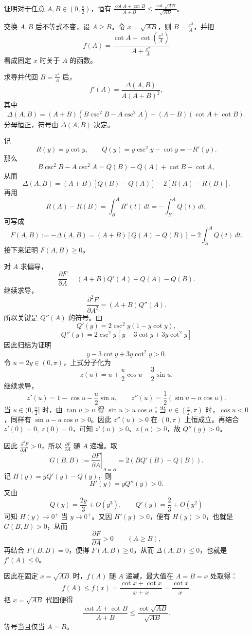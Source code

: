 \begin{example}
    证明对于任意 $A, B \in (0, \frac{\pi}{2})$，恒有 $\displaystyle\frac{\cot A + \cot B}{A+B} \le \frac{\cot \sqrt{AB}}{\sqrt{AB}}$。
\end{example}
\begin{solution}
交换 \(A,B\) 后不等式不变，设 \(A\ge B\)。令 \(x=\sqrt{AB}\)，则 \(B=\frac{x^2}{A}\)，并把
\[
f(A)=\frac{\cot A+\cot\!\left(\frac{x^2}{A}\right)}{A+\frac{x^2}{A}}
\]
看成固定 \(x\) 时关于 \(A\) 的函数。

求导并代回 \(B=\frac{x^2}{A}\) 后，
\[
f'(A)=\frac{\Delta(A,B)}{A(A+B)^2},
\]
其中
\[
\Delta(A,B)=(A+B)(B\csc^2B-A\csc^2A)-(A-B)(\cot A+\cot B).
\]
分母恒正，符号由 \(\Delta(A,B)\) 决定。

记
\[
R(y)=y\cot y,\qquad Q(y)=y\csc^2y-\cot y=-R'(y).
\]
那么
\[
B\csc^2B-A\csc^2A=Q(B)-Q(A)+\cot B-\cot A,
\]
从而
\[
\Delta(A,B)=(A+B)[Q(B)-Q(A)]-2[R(A)-R(B)].
\]
再用
\[
R(A)-R(B)=\int_B^A R'(t)\,dt=-\int_B^A Q(t)\,dt,
\]
可写成
\[
F(A,B):=-\Delta(A,B)=(A+B)[Q(A)-Q(B)]-2\int_B^A Q(t)\,dt.
\]
接下来证明 \(F(A,B)\ge0\)。

对 \(A\) 求偏导，
\[
\frac{\partial F}{\partial A}=(A+B)Q'(A)-Q(A)-Q(B).
\]
继续求导，
\[
\frac{\partial^2 F}{\partial A^2}=(A+B)Q''(A).
\]
所以关键是 \(Q''(A)\) 的符号。由
\[
Q'(y)=2\csc^2y(1-y\cot y),
\]
\[
Q''(y)=2\csc^2y\,[y-3\cot y+3y\cot^2y]
\]
因此归结为证明
\[
y-3\cot y+3y\cot^2y>0.
\]
令 \(u=2y\in(0,\pi)\)，上式分子化为
\[
z(u)=u+\frac{u}{2}\cos u-\frac32\sin u.
\]
继续求导，
\[
z'(u)=1-\cos u-\frac{u}{2}\sin u,\qquad
z''(u)=\frac12(\sin u-u\cos u).
\]
当 \(u\in(0,\frac{\pi}{2}]\) 时，由 \(\tan u>u\) 得 \(\sin u>u\cos u\)；当 \(u\in(\frac{\pi}{2},\pi)\) 时，\(\cos u<0\)，同样有 \(\sin u-u\cos u>0\)。因此 \(z''(u)>0\) 在 \((0,\pi)\) 上恒成立。再结合 \(z'(0)=0,\ z(0)=0\)，可知 \(z'(u)>0\)、\(z(u)>0\)，故 \(Q''(y)>0\)。

因此 \(\frac{\partial^2 F}{\partial A^2}>0\)，所以 \(\frac{\partial F}{\partial A}\) 随 \(A\) 递增。取
\[
G(B,B):=\left.\frac{\partial F}{\partial A}\right|_{A=B}=2(BQ'(B)-Q(B)).
\]
记 \(H(y)=yQ'(y)-Q(y)\)，则
\[
H'(y)=yQ''(y)>0.
\]
又由
\[
Q(y)=\frac{2y}{3}+O(y^3),\qquad Q'(y)=\frac{2}{3}+O(y^2)
\]
可知 \(H(y)\to0^+\) 当 \(y\to0^+\)。又因 \(H'(y)>0\)，便有 \(H(y)>0\)，也就是 \(G(B,B)>0\)，从而
\[
\frac{\partial F}{\partial A}>0\qquad(A\ge B),
\]
再结合 \(F(B,B)=0\)，便得 \(F(A,B)\ge0\)，从而 \(\Delta(A,B)\le0\)，也就是 \(f'(A)\le0\)。

因此在固定 \(x=\sqrt{AB}\) 时，\(f(A)\) 随 \(A\) 递减，最大值在 \(A=B=x\) 处取得：
\[
f(A)\le f(x)=\frac{\cot x+\cot x}{x+x}=\frac{\cot x}{x}.
\]
把 \(x=\sqrt{AB}\) 代回便得
\[
\frac{\cot A+\cot B}{A+B}\le \frac{\cot\sqrt{AB}}{\sqrt{AB}}.
\]
等号当且仅当 \(A=B\)。
\end{solution}
